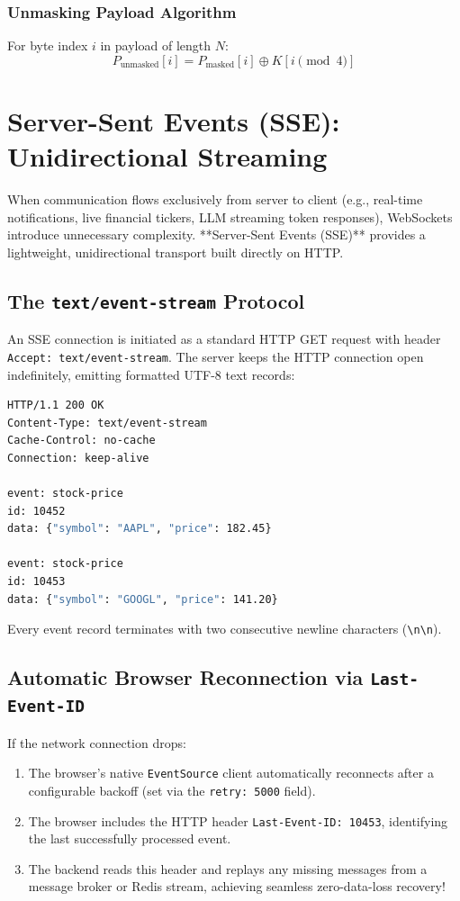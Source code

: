 \subsubsection{Unmasking Payload Algorithm}
For byte index $i$ in payload of length $N$:
$$P_{\text{unmasked}}[i] = P_{\text{masked}}[i] \oplus K[i \pmod 4]$$

\section{Server-Sent Events (SSE): Unidirectional Streaming}

When communication flows exclusively from server to client (e.g., real-time notifications, live financial tickers, LLM streaming token responses), WebSockets introduce unnecessary complexity. **Server-Sent Events (SSE)** provides a lightweight, unidirectional transport built directly on HTTP.

\subsection{The \texttt{text/event-stream} Protocol}

An SSE connection is initiated as a standard HTTP GET request with header \texttt{Accept: text/event-stream}. The server keeps the HTTP connection open indefinitely, emitting formatted UTF-8 text records:

\begin{lstlisting}[language=sh,caption={SSE Wire Format Stream}]
HTTP/1.1 200 OK
Content-Type: text/event-stream
Cache-Control: no-cache
Connection: keep-alive

event: stock-price
id: 10452
data: {"symbol": "AAPL", "price": 182.45}

event: stock-price
id: 10453
data: {"symbol": "GOOGL", "price": 141.20}

\end{lstlisting}

Every event record terminates with two consecutive newline characters (\texttt{\textbackslash n\textbackslash n}).

\subsection{Automatic Browser Reconnection via \texttt{Last-Event-ID}}

If the network connection drops:
\begin{enumerate}[leftmargin=15pt]
  \item The browser's native \texttt{EventSource} client automatically reconnects after a configurable backoff (set via the \texttt{retry: 5000} field).
  \item The browser includes the HTTP header \texttt{Last-Event-ID: 10453}, identifying the last successfully processed event.
  \item The backend reads this header and replays any missing messages from a message broker or Redis stream, achieving seamless zero-data-loss recovery!
\end{enumerate}

